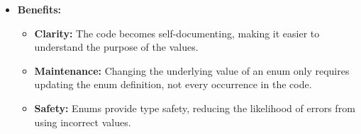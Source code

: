 \documentclass[10pt]{beamer}
\begin{document}
\begin{frame}
  \begin{itemize}
    \item \textbf{Benefits:}
    \begin{itemize}
        \item \textbf{Clarity:} The code becomes self-documenting, making it easier to understand the purpose of the values.
        \item \textbf{Maintenance:} Changing the underlying value of an enum only requires updating the enum definition, not every occurrence in the code.
        \item \textbf{Safety:} Enums provide type safety, reducing the likelihood of errors from using incorrect values.
    \end{itemize}
\end{itemize}
\end{frame}
\end{document}

